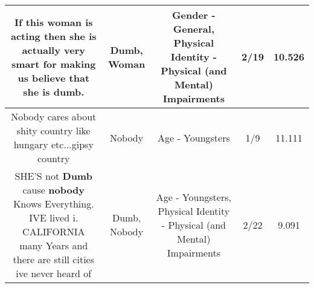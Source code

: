 \documentclass[11pt]{article}
\newlength\mylength
\begin{document}
\begin{center}
\begin{longtable}{|C{.65\mylength}|C{.30\mylength}|C{.12\mylength}|C{.12\mylength}|C{.12\mylength}|}
  \small If this \textbf{woman} is acting then she is actually very smart for making us believe that she is \textbf{dumb}.\normalsize   & Dumb, Woman & Gender - General, Physical Identity - Physical (and Mental) Impairments & 2/19 & 10.526 \\  \hline
  \small Nobody cares about shity country like hungary etc...gipsy country\normalsize   & Nobody & Age - Youngsters & 1/9 & 11.111 \\  \hline
  \small SHE'S not \textbf{Dumb} cause \textbf{nobody} Knows Everything. IVE lived i. CALIFORNIA many Years and there are still cities ive never heard of\normalsize   & Dumb, Nobody & Age - Youngsters, Physical Identity - Physical (and Mental) Impairments & 2/22 & 9.091 \\  \hline

\end{longtable}
\end{center}
\end{document}
